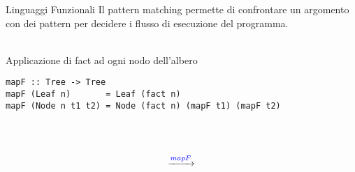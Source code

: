 \begin{frame}[containsverbatim]{Linguaggi Funzionali}
Il {\color{blue} pattern matching} permette di confrontare un argomento con dei pattern per decidere i flusso di esecuzione del programma.\\~\\

\begin{block}{\small Applicazione di fact ad ogni nodo dell'albero}
\begin{verbatim}
mapF :: Tree -> Tree 
mapF (Leaf n)       = Leaf (fact n)
mapF (Node n t1 t2) = Node (fact n) (mapF t1) (mapF t2)
\end{verbatim}
\end{block}
~\\
\begin{columns}

\begin{column}{0.4\textwidth}	
\centering
{}
\end{column}	
\begin{column}{0.2\textwidth}	
	\LARGE $${\xrightarrow{\textcolor{blue}{mapF}}}$$
\end{column}	
\begin{column}{0.4\textwidth}	
\centering
{}
\end{column}	

\end{columns}
    
\end{frame}

